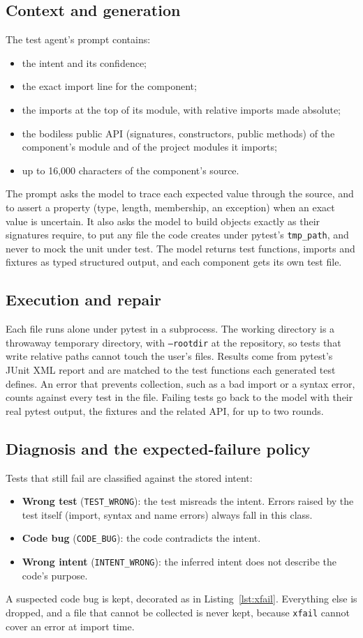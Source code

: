 \documentclass[11pt]{article}
\newcommand{\code}[1]{\texttt{#1}}
\begin{document}
\subsection{Context and generation}
The test agent's prompt contains:
\begin{itemize}
  \item the intent and its confidence;
  \item the exact import line for the component;
  \item the imports at the top of its module, with relative imports made absolute;
  \item the bodiless public API (signatures, constructors, public methods) of the component's module and of the project modules it imports;
  \item up to 16{,}000 characters of the component's source.
\end{itemize}
The prompt asks the model to trace each expected value through the source, and to assert a property (type, length, membership, an exception) when an exact value is uncertain.
It also asks the model to build objects exactly as their signatures require, to put any file the code creates under pytest's \code{tmp\_path}, and never to mock the unit under test.
The model returns test functions, imports and fixtures as typed structured output, and each component gets its own test file.

\subsection{Execution and repair}
Each file runs alone under pytest in a subprocess.
The working directory is a throwaway temporary directory, with \code{--rootdir} at the repository, so tests that write relative paths cannot touch the user's files.
Results come from pytest's JUnit XML report and are matched to the test functions each generated test defines.
An error that prevents collection, such as a bad import or a syntax error, counts against every test in the file.
Failing tests go back to the model with their real pytest output, the fixtures and the related API, for up to two rounds.

\subsection{Diagnosis and the expected-failure policy}
Tests that still fail are classified against the stored intent:
\begin{itemize}
  \item \textbf{Wrong test} (\code{TEST\_WRONG}): the test misreads the intent.
  Errors raised by the test itself (import, syntax and name errors) always fall in this class.
  \item \textbf{Code bug} (\code{CODE\_BUG}): the code contradicts the intent.
  \item \textbf{Wrong intent} (\code{INTENT\_WRONG}): the inferred intent does not describe the code's purpose.
\end{itemize}
A suspected code bug is kept, decorated as in Listing~\ref{lst:xfail}.
Everything else is dropped, and a file that cannot be collected is never kept, because \code{xfail} cannot cover an error at import time.
\end{document}
